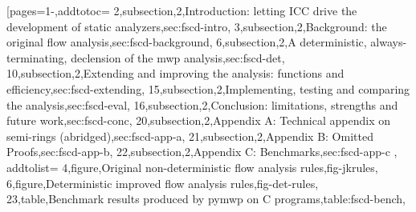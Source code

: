 [pages={1-},addtotoc={
    2,subsection,2,{Introduction: letting ICC drive the development of static analyzers},sec:fscd-intro,
    3,subsection,2,{Background: the original flow analysis},sec:fscd-background,
    6,subsection,2,{A deterministic, always-terminating, declension of the mwp analysis},sec:fscd-det,
    10,subsection,2,{Extending and improving the analysis: functions and efficiency},sec:fscd-extending,
    15,subsection,2,{Implementing, testing and comparing the analysis},sec:fscd-eval,
    16,subsection,2,{Conclusion: limitations, strengths and future work},sec:fscd-conc,
    20,subsection,2,{Appendix A: Technical appendix on semi-rings (abridged)},sec:fscd-app-a,
    21,subsection,2,{Appendix B: Omitted Proofs},sec:fscd-app-b,
    22,subsection,2,{Appendix C: Benchmarks},sec:fscd-app-c
}, addtolist={
    4,figure,{Original non-deterministic flow analysis rules},fig-jkrules,
    6,figure,{Deterministic improved flow analysis rules},fig-det-rules,
    23,table,{Benchmark results produced by pymwp on C programs},table:fscd-bench},
